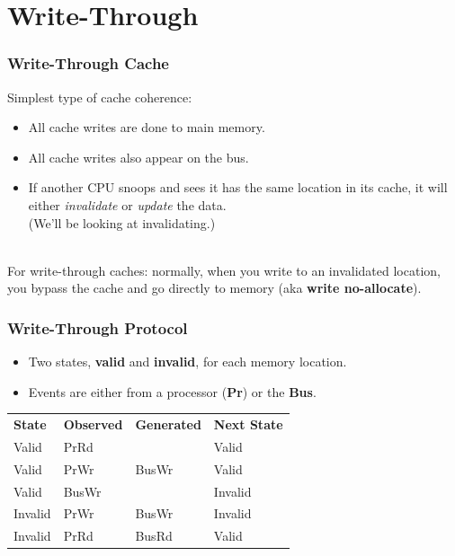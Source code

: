 \documentclass[aspectratio=43]{beamer}
\newenvironment{changemargin}[1]{%
  \begin{list}{}{%
    \setlength{\topsep}{0pt}%
    \setlength{\leftmargin}{#1}%
    \setlength{\rightmargin}{1em}
    \setlength{\listparindent}{\parindent}%
    \setlength{\itemindent}{\parindent}%
    \setlength{\parsep}{\parskip}%
  }%
  \item[]}{\end{list}}
\begin{document}
\section{Write-Through}
\begin{frame}
  \frametitle{Write-Through Cache}

  \begin{changemargin}{1cm}
Simplest type of cache coherence:
  \begin{itemize}
    \item All cache writes are done to main memory.
    \item All cache writes also appear on the bus.
    \item If another CPU snoops and sees it has the same location in
      its cache, it will either {\it invalidate} or {\it update} the
      data.\\ \qquad (We'll be looking at invalidating.)
  \end{itemize}
~\\

    For write-through caches: normally, when you write to an invalidated
    location, you bypass the cache and go directly to memory (aka {\bf
      write no-allocate}).

  \end{changemargin}
\end{frame}

\begin{frame}
  \frametitle{Write-Through Protocol}

  \begin{changemargin}{1cm}
  \begin{itemize}
    \item Two states, {\bf valid} and {\bf invalid}, for each memory location.
    \item Events are either from a processor ({\bf Pr}) or the {\bf Bus}.
  \end{itemize}
  \vfill
  \begin{center}
    \begin{tabular}{llll}
      {\bf State} & {\bf Observed} & {\bf Generated} & {\bf Next State}\\
      Valid   & PrRd  &       & Valid\\
      Valid   & PrWr  & BusWr & Valid\\
      Valid   & BusWr &       & Invalid\\
      Invalid & PrWr  & BusWr & Invalid\\
      Invalid & PrRd  & BusRd & Valid\\
    \end{tabular}
  \end{center}
  \end{changemargin}
\end{frame}
\end{document}
